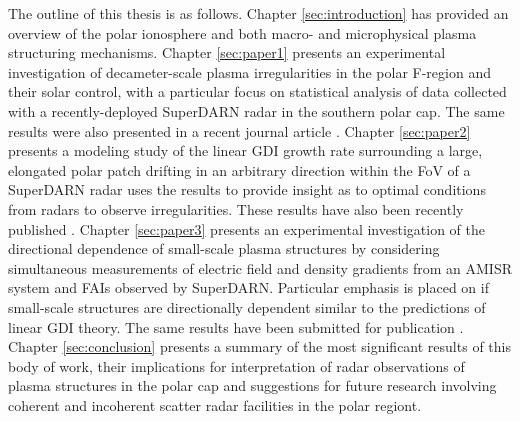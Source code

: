 The outline of this thesis is as follows.  Chapter \ref{sec:introduction} has provided an overview of the polar ionosphere and both macro- and microphysical plasma structuring mechanisms.  Chapter \ref{sec:paper1} presents an experimental investigation of decameter-scale plasma irregularities in the polar F-region and their solar control, with a particular focus on statistical analysis of data collected with a recently-deployed SuperDARN radar in the southern polar cap.  The same results were also presented in a recent journal article \citep{Lamarche2015}.  Chapter \ref{sec:paper2} presents a modeling study of the linear GDI growth rate surrounding a large, elongated polar patch drifting in an arbitrary direction within the FoV of a SuperDARN radar uses the results to provide insight as to optimal conditions from radars to observe irregularities.  These results have also been recently published \citep{Lamarche2016}.  Chapter \ref{sec:paper3} presents an experimental investigation of the directional dependence of small-scale plasma structures by considering simultaneous measurements of electric field and density gradients from an AMISR  system and FAIs observed by SuperDARN.  Particular emphasis is placed on if small-scale structures are directionally dependent similar to the predictions of linear GDI theory.  The same results have been submitted for publication \citep{Lamarche2017}.  Chapter \ref{sec:conclusion} presents a summary of the most significant results of this body of work, their implications for interpretation of radar observations of plasma structures in the polar cap and suggestions for future research involving coherent and incoherent scatter radar facilities in the polar regiont.




